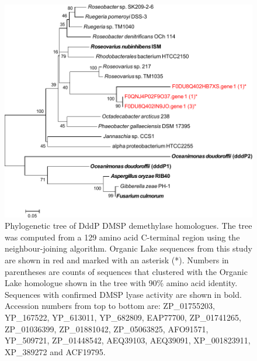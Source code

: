 \begin{figure}
\includegraphics{orglake_figures/dddP_tree.pdf}
\caption[Phylogenetic tree of DddP DMSP lyase homologues]{Phylogenetic tree of DddP DMSP demethylase homologues. The tree was computed from a 129 amino acid C-terminal region using the neighbour-joining algorithm. Organic Lake sequences from this study are shown in red and marked with an asterisk (*). Numbers in parentheses are counts of sequences that clustered with the Organic Lake homologue shown in the tree with 90\% amino acid identity. Sequences with confirmed DMSP lyase activity are shown in bold. Accession numbers from top to bottom are: ZP\_01755203, YP\_167522, YP\_613011, YP\_682809, EAP77700, ZP\_01741265, ZP\_01036399, ZP\_01881042, ZP\_05063825, AFO91571, YP\_509721, ZP\_01448542, AEQ39103, AEQ39091, XP\_001823911, XP\_389272 and ACF19795.}
\label{fig:dddP_tree}

\end{figure}
